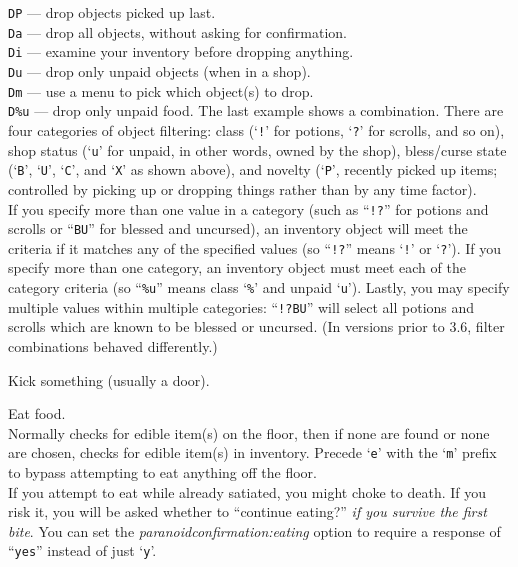 \documentclass[titlepage]{article}
\begin{document}
\begin{description}[font=\mdseries\ttfamily]
\texttt{DP}  --- drop objects picked up last.\\
\texttt{Da}  --- drop all objects, without asking for confirmation.\\
\texttt{Di}  --- examine your inventory before dropping anything.\\
\texttt{Du}  --- drop only unpaid objects (when in a shop).\\
\texttt{Dm}  --- use a menu to pick which object(s) to drop.\\
\texttt{D\%u} --- drop only unpaid food.
The last example shows a combination.
There are four categories of object filtering: class (`\texttt{!}' for
potions, `\texttt{?}' for scrolls, and so on), shop status (`\texttt{u}' for
unpaid, in other words, owned by the shop), bless/curse state
(`\texttt{B}', `\texttt{U}', `\texttt{C}', and `\texttt{X}' as shown above),
and novelty (`\texttt{P}', recently picked up items; controlled by picking
up or dropping things rather than by any time factor).
\\
If you specify more than one value in a category (such as ``\texttt{!?}'' for
potions and scrolls or ``\texttt{BU}'' for blessed and uncursed), an inventory
object will meet the criteria if it matches any of the specified
values (so ``\texttt{!?}'' means `\texttt{!}' or `\texttt{?}').
If you specify more than one category, an inventory object must meet
each of the category criteria (so ``\texttt{\%u}'' means class `\texttt{\%}' and
unpaid `\texttt{u}').
Lastly, you may specify multiple values within multiple categories:
``\texttt{!?BU}'' will select all potions and scrolls which are known to be
blessed or uncursed.
(In versions prior to 3.6, filter combinations behaved differently.)
\item[\textasciicircum D]
Kick something (usually a door).
\item[e]
Eat food.\\
Normally checks for edible item(s) on the floor, then if none are found
or none are chosen, checks for edible item(s) in inventory.
Precede `\texttt{e}' with the `\texttt{m}' prefix to bypass attempting to eat
anything off the floor.\\
If you attempt to eat while already satiated, you might choke to death.
If you risk it, you will be asked whether
to ``continue eating?'' \textit{if you survive the first bite}.
You can set the
\textit{paranoid\textunderscore confirmation:eating}
option to require a response of ``\texttt{yes}'' instead of just `\texttt{y}'.

\end{description}
\end{document}
